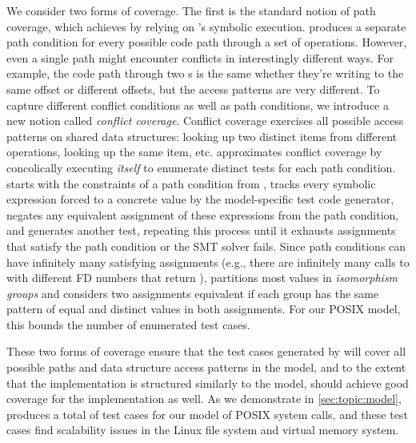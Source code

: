 We consider two forms of coverage.
The first is the standard notion of path coverage, which \testgen
achieves by relying on \analyzer's symbolic execution.
%
\analyzer produces a separate path condition for every possible code
path through a set of operations.
%
However, even a single path might encounter conflicts in interestingly
different ways.
%
For example, the code path through two s is the
same whether they're writing to the same offset or different offsets,
but the access patterns are very different.
%
To capture different conflict conditions as well as path conditions, we
introduce a new notion called \emph{conflict coverage}.  Conflict coverage
exercises all possible access patterns on shared data structures:
looking up two distinct items from different operations, looking up
the same item, etc.
%
\testgen approximates
conflict coverage by concolically executing \emph{itself}
to enumerate distinct tests for each path condition.  \testgen
starts with the constraints of a path condition from \analyzer, tracks
every symbolic expression forced to a concrete value by the
model-specific test code
generator, negates any equivalent assignment of these expressions from
the path condition, and generates another test, repeating this process
until it exhausts assignments that satisfy the path condition or the SMT
solver fails.  Since
path conditions can have infinitely many satisfying assignments (e.g.,
there are infinitely many calls to  with different FD numbers
that return ), \testgen partitions most values in
\emph{isomorphism groups} and considers two assignments equivalent if
each group has the same
pattern of equal and distinct values in both assignments.  For our POSIX
model, this
bounds the number of enumerated test cases.

These two forms of coverage ensure that the test cases
generated by \testgen will cover all possible paths and data structure
access patterns in the model, and to the extent that the implementation
is structured similarly to the model, should achieve good coverage
for the implementation as well.  As we demonstrate in \cref{sec:topic:model},
\testgen produces a total of  test cases
for our model of  POSIX
system calls, and these
test cases find scalability issues in the Linux  file system
and virtual memory system.


\subsection{\mtrace}
\label{sec:tool:mtrace}

